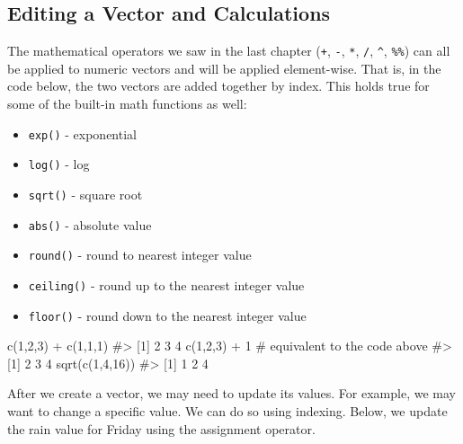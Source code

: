 \documentclass[
  letterpaper,
]{krantz}
\makeatletter
\newenvironment{Shaded}{\begin{snugshade}}{\end{snugshade}}
\newcommand{\CommentTok}[1]{\textcolor[rgb]{0.37,0.37,0.37}{#1}}
\newcommand{\DecValTok}[1]{\textcolor[rgb]{0.68,0.00,0.00}{#1}}
\newcommand{\FunctionTok}[1]{\textcolor[rgb]{0.28,0.35,0.67}{#1}}
\newcommand{\NormalTok}[1]{\textcolor[rgb]{0.00,0.23,0.31}{#1}}
\newcommand{\SpecialCharTok}[1]{\textcolor[rgb]{0.37,0.37,0.37}{#1}}
\providecommand{\tightlist}{%
  \setlength{\itemsep}{0pt}\setlength{\parskip}{0pt}}\usepackage{longtable,booktabs,array}
\newenvironment{kframe}{%
\medskip{}
\setlength{\fboxsep}{.8em}
 \def\at@end@of@kframe{}%
 \ifinner\ifhmode%
  \def\at@end@of@kframe{\end{minipage}}%
  \begin{minipage}{\columnwidth}%
 \fi\fi%
 \def\FrameCommand##1{\hskip\@totalleftmargin \hskip-\fboxsep
 \colorbox{shadecolor}{##1}\hskip-\fboxsep
     \hskip-\linewidth \hskip-\@totalleftmargin \hskip\columnwidth}%
 \MakeFramed {\advance\hsize-\width
   \@totalleftmargin\z@ \linewidth\hsize
   \@setminipage}}%
 {\par\unskip\endMakeFramed%
 \at@end@of@kframe}
\renewenvironment{Shaded}{\begin{kframe}}{\end{kframe}}
\makeatother
\begin{document}
\subsection{Editing a Vector and
Calculations}\label{editing-a-vector-and-calculations}

The mathematical operators we saw in the last chapter (\texttt{+},
\texttt{-}, \texttt{*}, \texttt{/}, \texttt{\^{}}, \texttt{\%\%}) can
all be applied to numeric vectors and will be applied element-wise. That
is, in the code below, the two vectors are added together by index. This
holds true for some of the built-in math functions as well:

\begin{itemize}
\tightlist
\item
  \texttt{exp()} - exponential
\item
  \texttt{log()} - log
\item
  \texttt{sqrt()} - square root
\item
  \texttt{abs()} - absolute value
\item
  \texttt{round()} - round to nearest integer value
\item
  \texttt{ceiling()} - round up to the nearest integer value
\item
  \texttt{floor()} - round down to the nearest integer value
\end{itemize}

\begin{Shaded}
\begin{Highlighting}[]
\FunctionTok{c}\NormalTok{(}\DecValTok{1}\NormalTok{,}\DecValTok{2}\NormalTok{,}\DecValTok{3}\NormalTok{) }\SpecialCharTok{+} \FunctionTok{c}\NormalTok{(}\DecValTok{1}\NormalTok{,}\DecValTok{1}\NormalTok{,}\DecValTok{1}\NormalTok{)}
\CommentTok{\#\textgreater{} [1] 2 3 4}
\FunctionTok{c}\NormalTok{(}\DecValTok{1}\NormalTok{,}\DecValTok{2}\NormalTok{,}\DecValTok{3}\NormalTok{) }\SpecialCharTok{+} \DecValTok{1} \CommentTok{\# equivalent to the code above}
\CommentTok{\#\textgreater{} [1] 2 3 4}
\FunctionTok{sqrt}\NormalTok{(}\FunctionTok{c}\NormalTok{(}\DecValTok{1}\NormalTok{,}\DecValTok{4}\NormalTok{,}\DecValTok{16}\NormalTok{))}
\CommentTok{\#\textgreater{} [1] 1 2 4}
\end{Highlighting}
\end{Shaded}

After we create a vector, we may need to update its values. For example,
we may want to change a specific value. We can do so using indexing.
Below, we update the rain value for Friday using the assignment
operator.
\end{document}
